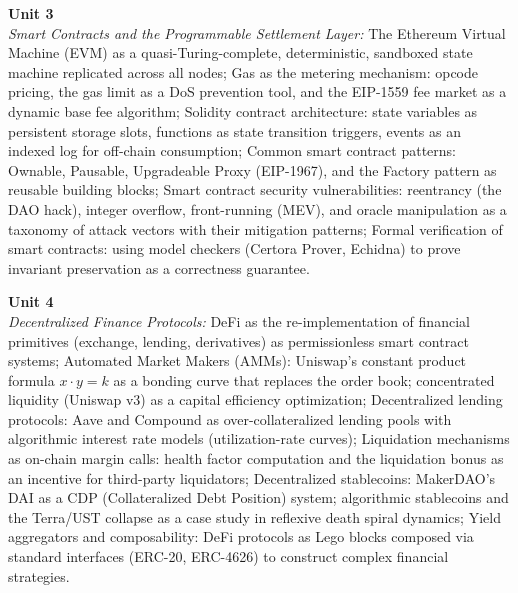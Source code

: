 \vspace{0.3cm}

\noindent\textbf{Unit 3} \\
\textit{Smart Contracts and the Programmable Settlement Layer:} The Ethereum Virtual Machine (EVM) as a quasi-Turing-complete, deterministic, sandboxed state machine replicated across all nodes; Gas as the metering mechanism: opcode pricing, the gas limit as a DoS prevention tool, and the EIP-1559 fee market as a dynamic base fee algorithm; Solidity contract architecture: state variables as persistent storage slots, functions as state transition triggers, events as an indexed log for off-chain consumption; Common smart contract patterns: Ownable, Pausable, Upgradeable Proxy (EIP-1967), and the Factory pattern as reusable building blocks; Smart contract security vulnerabilities: reentrancy (the DAO hack), integer overflow, front-running (MEV), and oracle manipulation as a taxonomy of attack vectors with their mitigation patterns; Formal verification of smart contracts: using model checkers (Certora Prover, Echidna) to prove invariant preservation as a correctness guarantee.

\vspace{0.3cm}

\noindent\textbf{Unit 4} \\
\textit{Decentralized Finance Protocols:} DeFi as the re-implementation of financial primitives (exchange, lending, derivatives) as permissionless smart contract systems; Automated Market Makers (AMMs): Uniswap's constant product formula $x \cdot y = k$ as a bonding curve that replaces the order book; concentrated liquidity (Uniswap v3) as a capital efficiency optimization; Decentralized lending protocols: Aave and Compound as over-collateralized lending pools with algorithmic interest rate models (utilization-rate curves); Liquidation mechanisms as on-chain margin calls: health factor computation and the liquidation bonus as an incentive for third-party liquidators; Decentralized stablecoins: MakerDAO's DAI as a CDP (Collateralized Debt Position) system; algorithmic stablecoins and the Terra/UST collapse as a case study in reflexive death spiral dynamics; Yield aggregators and composability: DeFi protocols as Lego blocks composed via standard interfaces (ERC-20, ERC-4626) to construct complex financial strategies.

\vspace{0.3cm}

